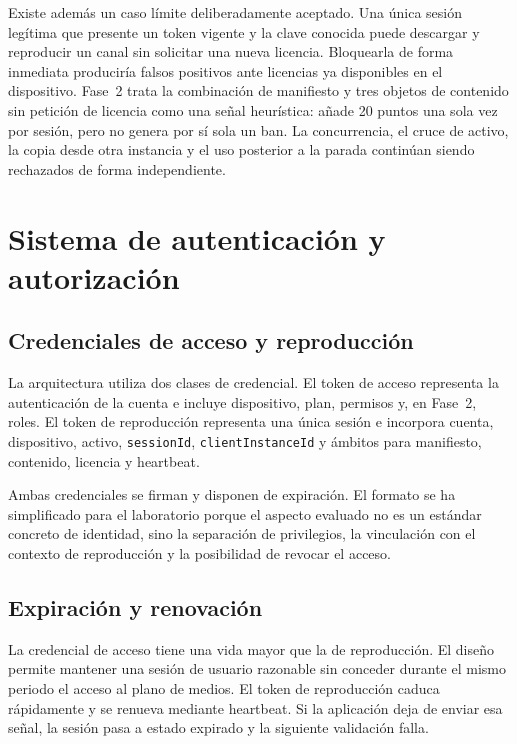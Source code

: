 Existe además un caso límite deliberadamente aceptado. Una única sesión legítima que presente un token vigente y la clave conocida puede descargar y reproducir un canal sin solicitar una nueva licencia. Bloquearla de forma inmediata produciría falsos positivos ante licencias ya disponibles en el dispositivo. Fase~2 trata la combinación de manifiesto y tres objetos de contenido sin petición de licencia como una señal heurística: añade 20 puntos una sola vez por sesión, pero no genera por sí sola un ban. La concurrencia, el cruce de activo, la copia desde otra instancia y el uso posterior a la parada continúan siendo rechazados de forma independiente.

\section{Sistema de autenticación y autorización}

\subsection{Credenciales de acceso y reproducción}

La arquitectura utiliza dos clases de credencial. El token de acceso representa la autenticación de la cuenta e incluye dispositivo, plan, permisos y, en Fase~2, roles. El token de reproducción representa una única sesión e incorpora cuenta, dispositivo, activo, \nolinkurl{sessionId}, \nolinkurl{clientInstanceId} y ámbitos para manifiesto, contenido, licencia y heartbeat.

Ambas credenciales se firman y disponen de expiración. El formato se ha simplificado para el laboratorio porque el aspecto evaluado no es un estándar concreto de identidad, sino la separación de privilegios, la vinculación con el contexto de reproducción y la posibilidad de revocar el acceso.

\subsection{Expiración y renovación}

La credencial de acceso tiene una vida mayor que la de reproducción. El diseño permite mantener una sesión de usuario razonable sin conceder durante el mismo periodo el acceso al plano de medios. El token de reproducción caduca rápidamente y se renueva mediante heartbeat. Si la aplicación deja de enviar esa señal, la sesión pasa a estado expirado y la siguiente validación falla.

